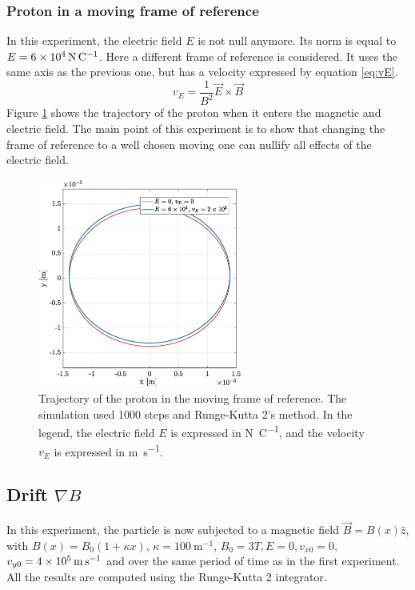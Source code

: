 \documentclass[a4paper,12pt,twoside]{article}
\begin{document}
\subsubsection{Proton in a moving frame of reference}
In this experiment, the electric field $E$ is not null anymore.
Its norm is equal to $E=\SI{6d4}{\newton\per\coulomb}$.
Here a different frame of reference is considered.
It uses the same axis as the previous one, but has a velocity expressed by equation \ref{eq:vE}.
\begin{equation}
	v_E = \frac{1}{B^2}\vec{E}\times\vec{B}
	\label{eq:vE}
\end{equation}%
Figure \ref{fig:app1_iii_traj} shows the trajectory of the proton when it enters the magnetic and electric field.
The main point of this experiment is to show that changing the frame of reference to a well chosen moving one can nullify all effects of the electric field.
\begin{figure}[h]
\centering
	\includegraphics[width=0.6\textwidth]{graphs/app1_iii_traj.eps}
	\caption{Trajectory of the proton in the moving frame of reference. The simulation used \num{1000} steps and Runge-Kutta 2's method. In the legend, the electric field $E$ is expressed in \si{\newton\per\coulomb}, and the velocity $v_E$ is expressed in \si{\meter\per\second}.}
	\label{fig:app1_iii_traj}
\end{figure}




\subsection{Drift $\nabla B$}
In this experiment, the particle is now subjected to a magnetic field $\vec{B}=B(x)\hat{z}$, with $B(x)=B_0(1+\kappa x)$, $\kappa=\SI{100}{\metre^{-1}}$, $B_0=3T, E=0, v_{x0}=0$, $v_{y0}=\SI{4d5}{\metre\per\second}$ and over the same period of time as in the first experiment.
All the results are computed using the Runge-Kutta 2 integrator.
\end{document}

